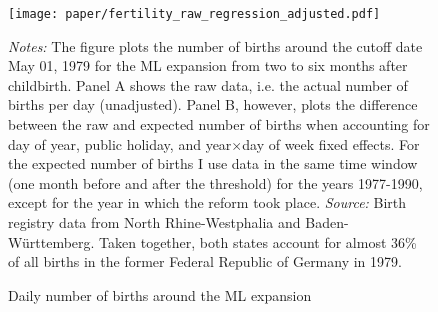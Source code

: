 \documentclass[11pt, a4paper, draft]{article} %
\begin{document}

	\vspace*{\fill}
\begin{figure}[H]\centering
	\caption{Daily number of births around the ML expansion}\label{fig: fertilitydistr}
	\texttt{[image: paper/fertility\_raw\_regression\_adjusted.pdf]}
	\scriptsize
	\begin{minipage}{0.9 \linewidth}
		\emph{Notes:} The figure plots the number of births around the cutoff date May 01, 1979 for the ML expansion from two to six months after childbirth. Panel A shows the raw data, i.e. the actual number of births per day (unadjusted). Panel B, however, plots the difference between the raw and expected number of births when accounting for day of year, public holiday, and year$\times$day of week fixed effects. For the expected number of births I use data in the same time window (one month before and after the threshold) for the years 1977-1990, except for the year in which the reform took place. \newline\emph{Source:} Birth registry data from North Rhine-Westphalia and Baden-Württemberg. Taken together, both states account for almost 36\% of all births in the former Federal Republic of Germany in 1979.
	\end{minipage}
\end{figure}
\vspace*{\fill}\clearpage
\end{document}
